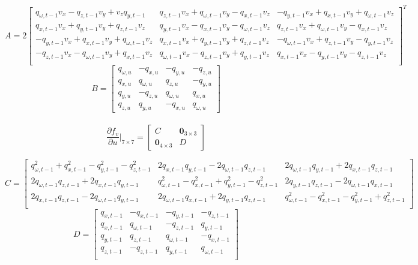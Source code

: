 \documentclass[master,korean,final]{cbnu-ecs}
\begin{document}
\[
A=
2\begin{bmatrix}
  q_{\omega,t-1} v_x  -q_{z,t-1} v_y   +  v_z q_{y,t-1} 	& q_{z,t-1} v_x  + q_{\omega,t-1} v_y  - q_{x,t-1} v_z 	& - q_{y,t-1} v_x  + q_{x,t-1} v_y  +   q_{\omega,t-1} v_z \\
  q_{x,t-1} v_x  + q_{y,t-1} v_y  + q_{z,t-1} v_z 		& q_{y,t-1} v_x  - q_{x,t-1} v_y  -q_{\omega,t-1} v_z 	&  q_{z,t-1} v_x +  q_{\omega,t-1} v_y -   q_{x,t-1} v_z  \\
  -q_{y,t-1} v_x + q_{x,t-1} v_y  + q_{\omega,t-1}  v_z	& q_{x,t-1} v_x  + q_{y,t-1} v_y  +  q_{z,t-1} v_z 		& - q_{\omega,t-1} v_x + q_{z,t-1} v_y -   q_{y,t-1} v_z \\
  -q_{z,t-1} v_x - q_{\omega,t-1} v_y  + q_{x,t-1} v_z 	& q_{\omega,t-1} v_x - q_{z,t-1} v_y  +  q_{y,t-1} v_z 	&  q_{x,t-1} v_x  - q_{y,t-1} v_y -  q_{z,t-1} v_z \\
\end{bmatrix}^T
\]
\[B=
\begin{bmatrix}
 q_{\omega,u}& - q_{x,u}& - q_{y,u}& - q_{z,u}\\
 q_{x,u}&  q_{\omega,u}&  q_{z,u}& - q_{y,u}\\
 q_{y,u}& - q_{z,u}&  q_{\omega,u}&  q_{x,u}\\
 q_{z,u}&  q_{y,u}& - q_{x,u}&  q_{\omega,u}
\end{bmatrix}
\]
\\
\[
{\frac{\partial f_v}{\partial u}}\bigg|_{7\times7} =
\begin{bmatrix}
C & \mathbf{0}_{3\times3} \\
\mathbf{0}_{4\times3} & D
\end{bmatrix}
\]

\[
C=
\begin{bmatrix}
 q_{\omega,t-1}^2 +  q_{x,t-1}^2 -  q_{y,t-1}^2 -  q_{z,t-1}^2		& 2  q_{x,t-1}  q_{y,t-1} - 2  q_{\omega,t-1}  q_{z,t-1}			& 2  q_{\omega,t-1}  q_{y,t-1} + 2  q_{x,t-1}  q_{z,t-1}			\\
2 q_{\omega,t-1}  q_{z,t-1} + 2  q_{x,t-1}  q_{y,t-1}			&  q_{\omega,t-1}^2 -  q_{x,t-1}^2 +  q_{y,t-1}^2 -  q_{z,t-1}^2	& 2  q_{y,t-1}  q_{z,t-1} - 2  q_{\omega,t-1}  q_{x,t-1}			\\
2 q_{x,t-1}  q_{z,t-1} - 2  q_{\omega,t-1}  q_{y,t-1}			& 2  q_{\omega,t-1}  q_{x,t-1} + 2  q_{y,t-1}  q_{z,t-1}			&  q_{\omega,t-1}^2 -  q_{x,t-1}^2 -  q_{y,t-1}^2 +  q_{z,t-1}^2	\\
\end{bmatrix}\]
\[D=
\begin{bmatrix}
q_{x,t-1}& -q_{x,t-1}& -q_{y,t-1}& -q_{z,t-1}\\
q_{x,t-1}&  q_{\omega,t-1}& -q_{z,t-1}& q_{y,t-1}\\
q_{y,t-1}&  q_{z,t-1}&  q_{\omega,t-1}&-q_{x,t-1}\\
q_{z,t-1}& -q_{z,t-1}&  q_{y,t-1}&q_{\omega,t-1}\\
\end{bmatrix}
\]
\end{document}
